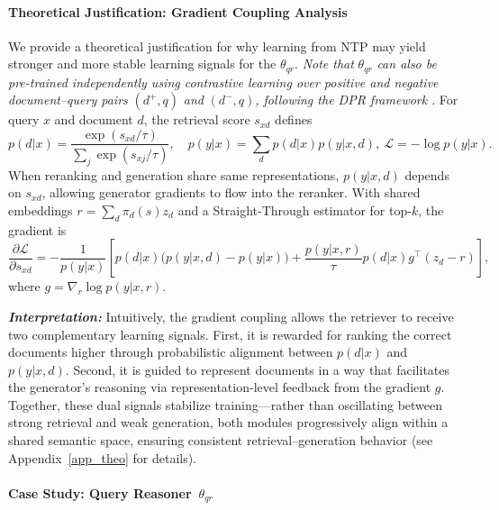 \documentclass{applemlr}
\newcommand{\Interpre}[1]{
\begin{tcolorbox}[colback=findingbg, colframe=findingframe,
  left=1pt,
  right=1pt,
  top=1pt,
  bottom=1pt]
{\textbf{\emph{Interpretation:} }#1}
\end{tcolorbox}
}
\numberwithin{equation}{section}
\begin{document}
\paragraph{Theoretical Justification: Gradient Coupling Analysis}
\label{sec:theory}
We provide a theoretical justification for why learning from NTP may yield stronger and more stable learning signals for the $\theta_{qr}$. \noindent\textit{Note that} $\theta_{qr}$ \textit{can also be pre-trained independently using contrastive learning over positive and negative document--query pairs} $(d^{+}, q)$ \textit{and} $(d^{-}, q)$\textit{, following the DPR framework} \citep{zhou2025optimizingretrievalragreinforced}\textit{.}
For query $x$ and document $d$, the retrieval score $s_{xd}$ defines
\[
p(d|x)=\frac{\exp(s_{xd}/\tau)}{\sum_{j}\exp(s_{xj}/\tau)}, \quad
p(y|x)=\sum_{d}p(d|x)p(y|x,d),\ \mathcal{L}=-\log p(y|x).
\]
When reranking and generation share same representations, $p(y|x,d)$ depends on $s_{xd}$, allowing generator gradients to flow into the reranker.
With shared embeddings $r=\sum_d \pi_d(s)z_d$ and a Straight-Through estimator for top-$k$, the gradient is
\[
\frac{\partial \mathcal{L}}{\partial s_{xd}}
= -\frac{1}{p(y|x)}\!\left[
p(d|x)\!\big(p(y|x,d)-p(y|x)\big)
+\frac{p(y|x,r)}{\tau}p(d|x)g^\top(z_d-r)
\right],
\]
where $g=\nabla_r\log p(y|x,r)$.  

\Interpre{
Intuitively, the gradient coupling allows the retriever to receive two complementary learning signals.  
First, it is rewarded for ranking the correct documents higher through probabilistic alignment between $p(d|x)$ and $p(y|x,d)$.  
Second, it is guided to represent documents in a way that facilitates the generator’s reasoning via representation-level feedback from the gradient $g$.  
Together, these dual signals stabilize training—rather than oscillating between strong retrieval and weak generation, both modules progressively align within a shared semantic space, ensuring consistent retrieval–generation behavior (see Appendix~\ref{app_theo} for details).}

\paragraph{Case Study: Query Reasoner~$\theta_{qr}$}
\end{document}
